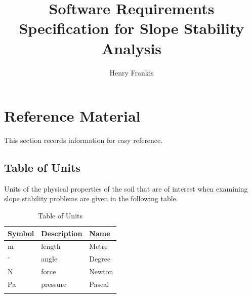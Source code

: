 \documentclass[12pt]{article}
\title{Software Requirements Specification for Slope Stability Analysis}
\author{Henry Frankis}
\begin{document}
\maketitle
\tableofcontents
\newpage
\section{Reference Material}
\label{Sec:RM}
This section records information for easy reference.
\subsection{Table of Units}
\label{Sec:ToU}
Units of the physical properties of the soil that are of interest when examining slope stability problems are given in the following table.
\begin{longtable}{l l l}
\toprule
Symbol & Description & Name
\\
\midrule
m & length & Metre
\\
${}^{\circ}$ & angle & Degree
\\
N & force & Newton
\\
Pa & pressure & Pascal
\\
\bottomrule
\caption{Table of Units}
\label{Table:ToU}
\end{longtable}
\end{document}
